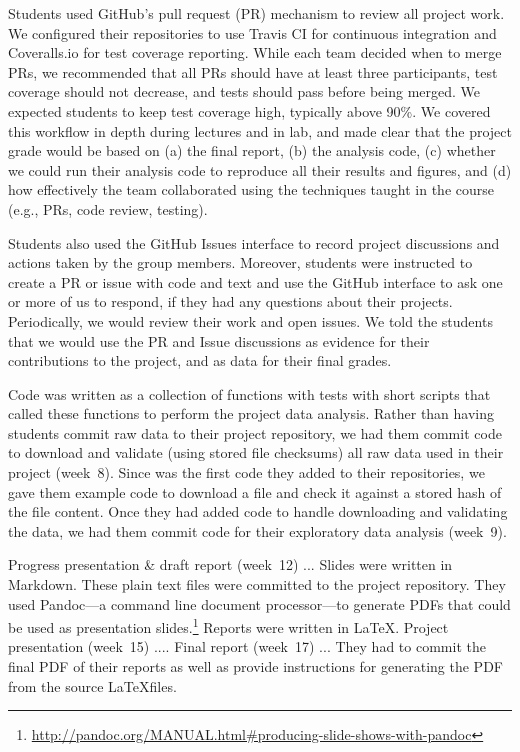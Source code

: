Students used GitHub's pull request (PR) mechanism to review all project work.
We configured their repositories to use Travis CI for continuous integration
and Coveralls.io for test coverage reporting.
While each team decided when to merge PRs, we recommended that all PRs should
have at least three participants, test coverage should not decrease, and tests
should pass before being merged.
We expected students to keep test coverage high, typically above 90\%.
We covered this workflow in depth during lectures and in lab,
and made clear that the project grade would be based on
(a) the final report,
(b) the analysis code,
(c) whether we could run their analysis code to reproduce all
their results and figures, and
(d) how effectively the team collaborated using the techniques
taught in the course (e.g., PRs, code review, testing).

Students also used the GitHub Issues interface to record project discussions
and actions taken by the group members.
Moreover, students were instructed to create a PR
or issue with code and text and use the GitHub interface to ask one or more
of us to respond, if they had any questions about their projects.
Periodically, we would review their work and open issues.
We told the students that we would use the PR and Issue discussions
as evidence for their contributions to the project, and as data for their
final grades.

Code was written as a collection of functions with tests with short
scripts that called these functions to perform the project data analysis.
Rather than having students commit raw data to their project repository, we had
them commit code to download and validate (using stored file checksums)
all raw data used in their project (week~8).
Since was the first code they added to their repositories, we gave them example
code to download a file and check it against a stored hash of the file
content.
Once they had added code to handle downloading and validating the data,
we had them commit code for their exploratory data analysis (week~9).


Progress presentation \& draft report (week~12) ...
Slides were written in Markdown.
These plain text files were committed to the project repository.
They used Pandoc---a command line document processor---to generate
PDFs that could be used as presentation
slides.\footnote{\url{http://pandoc.org/MANUAL.html\#producing-slide-shows-with-pandoc}}
Reports were written in \LaTeX.
Project presentation (week~15) ....
Final report (week~17) ...
They had to commit the final PDF of their reports as well as
provide instructions for generating the PDF from the source
\LaTeX files.


